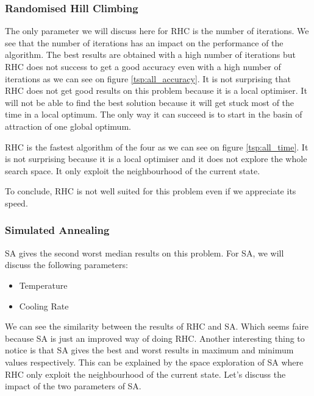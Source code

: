 \documentclass[twocolumn, 10pt]{article}
\begin{document}
			\subsubsection*{Randomised Hill Climbing}
				The only parameter we will discuss here for RHC is the number of iterations. We see that the number of iterations has an impact on the performance of the algorithm. The best results are obtained with a high number of iterations but RHC does not success to get a good accuracy even with a high number of iterations as we can see on figure \ref{tsp:all_accuracy}. It is not surprising that RHC does not get good results on this problem because it is a local optimiser. It will not be able to find the best solution because it will get stuck most of the time in a local optimum. The only way it can succeed is to start in the basin of attraction of one global optimum.

				RHC is the fastest algorithm of the four as we can see on figure \ref{tsp:all_time}. It is not surprising because it is a local optimiser and it does not explore the whole search space. It only exploit the neighbourhood of the current state.

				To conclude, RHC is not well suited for this problem even if we appreciate its speed.
			\subsubsection*{Simulated Annealing}
				SA gives the second worst median results on this problem. For SA, we will discuss the following parameters:
				\begin{itemize}
					\item Temperature
					\item Cooling Rate
				\end{itemize}
				We can see the similarity between the results of RHC and SA. Which seems faire because SA is just an improved way of doing RHC. Another interesting thing to notice is that SA gives the best and worst results in maximum and minimum values respectively. This can be explained by the space exploration of SA where RHC only exploit the neighbourhood of the current state. Let's discuss the impact of the two parameters of SA.
\end{document}
